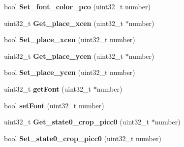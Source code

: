 \begin{DoxyCompactItemize}
\item 
\hypertarget{class_nex_d_s_button_a25e696769de8d33a3e49db15e0b55aaa}{bool {\bfseries Set\+\_\+font\+\_\+color\+\_\+pco} (uint32\+\_\+t number)}\label{class_nex_d_s_button_a25e696769de8d33a3e49db15e0b55aaa}

\item 
\hypertarget{class_nex_d_s_button_ae65ba8eab275c097fa1f9e7f8873dc5d}{uint32\+\_\+t {\bfseries Get\+\_\+place\+\_\+xcen} (uint32\+\_\+t $\ast$number)}\label{class_nex_d_s_button_ae65ba8eab275c097fa1f9e7f8873dc5d}

\item 
\hypertarget{class_nex_d_s_button_a0bc679dfaca7aa0439f67bb91814f97a}{bool {\bfseries Set\+\_\+place\+\_\+xcen} (uint32\+\_\+t number)}\label{class_nex_d_s_button_a0bc679dfaca7aa0439f67bb91814f97a}

\item 
\hypertarget{class_nex_d_s_button_a2b5c825ceaeeaa588b4830da4f154b23}{uint32\+\_\+t {\bfseries Get\+\_\+place\+\_\+ycen} (uint32\+\_\+t $\ast$number)}\label{class_nex_d_s_button_a2b5c825ceaeeaa588b4830da4f154b23}

\item 
\hypertarget{class_nex_d_s_button_a356b829500f25b3d5050084474da1165}{bool {\bfseries Set\+\_\+place\+\_\+ycen} (uint32\+\_\+t number)}\label{class_nex_d_s_button_a356b829500f25b3d5050084474da1165}

\item 
\hypertarget{class_nex_d_s_button_a3010cd4aa559a30088ad9bf987003adc}{uint32\+\_\+t {\bfseries get\+Font} (uint32\+\_\+t $\ast$number)}\label{class_nex_d_s_button_a3010cd4aa559a30088ad9bf987003adc}

\item 
\hypertarget{class_nex_d_s_button_a2ac5df458d5da7ffdc32bc16160472f8}{bool {\bfseries set\+Font} (uint32\+\_\+t number)}\label{class_nex_d_s_button_a2ac5df458d5da7ffdc32bc16160472f8}

\item 
\hypertarget{class_nex_d_s_button_aa48f68183cdbb94e376f1ca0367a2f2c}{uint32\+\_\+t {\bfseries Get\+\_\+state0\+\_\+crop\+\_\+picc0} (uint32\+\_\+t $\ast$number)}\label{class_nex_d_s_button_aa48f68183cdbb94e376f1ca0367a2f2c}

\item 
\hypertarget{class_nex_d_s_button_a8a0427fa8a95021452da9af2f0834eee}{bool {\bfseries Set\+\_\+state0\+\_\+crop\+\_\+picc0} (uint32\+\_\+t number)}\label{class_nex_d_s_button_a8a0427fa8a95021452da9af2f0834eee}


\end{DoxyCompactItemize}
